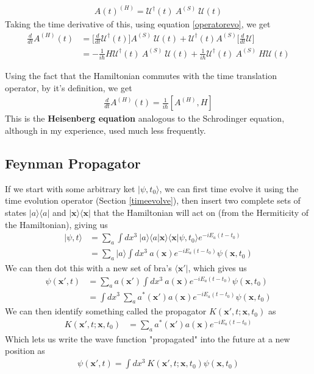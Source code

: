 \begin{align}
    A(t)^{(H)} = \mathcal{U}^\dagger(t)~ A^{(S)}~\mathcal{U}(t)
\end{align}
Taking the time derivative of this, using equation \ref{operatorevo}, we get
\begin{align}
    \frac{d}{dt} A^{(H)}(t) &= \Big[\frac{d}{dt}\mathcal{U}^\dagger(t)\Big]A^{(S)}~\mathcal{U}(t) + \mathcal{U}^\dagger(t)A^{(S)}\Big[\frac{d}{dt}\mathcal{U}\Big]\\
    &= - \frac{1}{i\hbar}H\mathcal{U}^\dagger(t)~ A^{(S)}~\mathcal{U}(t) + \frac{1}{i\hbar}\mathcal{U}^\dagger(t)~ A^{(S)}~H\mathcal{U}(t)
\end{align}

Using the fact that the Hamiltonian commutes with the time translation operator, by it's definition, we get 
\begin{align}
\frac{d}{dt} A^{(H)}(t) = \frac{1}{i\hbar}[A^{(H)},H]
\end{align}
This is the \textbf{Heisenberg equation} analogous to the Schrodinger equation, although in my experience, used much less frequently.

\subsection{Feynman Propagator}
If we start with some arbitrary ket $|\psi, t_0\rangle$, we can first time evolve it using the time evolution operator (Section \ref{timeevolve}), then insert two complete sets of states $|a\rangle\langle a|$  and $|\textbf{x}\rangle\langle\textbf{x}|$ that the Hamiltonian will act on (from the Hermiticity of the Hamiltonian), giving us
\begin{align}
|\psi, t\rangle &= \sum_a \int dx^3~|a\rangle\langle a|\textbf{x}\rangle \langle\textbf{x}|\psi,t_0\rangle e^{-iE_a(t-t_0)}\\
&=\sum_a |a\rangle \int dx^3~a(\textbf{x})e^{-iE_a(t-t_0)}\psi(\textbf{x},t_0) 
\end{align}
We can then dot this with a new set of bra's $\langle \textbf{x}'|$, which gives us
\begin{align}
\psi(\textbf{x}', t) &= \sum_a a(\textbf{x}') \int dx^3~a(\textbf{x})e^{-iE_a(t-t_0)}\psi(\textbf{x},t_0)\\
&= \int dx^3~\sum_a a^*(\textbf{x}') a(\textbf{x})e^{-iE_a(t-t_0)}\psi(\textbf{x},t_0)
\end{align}
We can then identify something called the propagator $K(\textbf{x}', t;\textbf{x},t_0)$ as
\begin{align}
K(\textbf{x}', t;\textbf{x},t_0) &= \sum_a a^*(\textbf{x}') a(\textbf{x})e^{-iE_a(t-t_0)}
\end{align}
Which lets us write the wave function "propagated" into the future at a new position as
\begin{align}
\psi(\textbf{x}', t) = \int dx^3~K(\textbf{x}', t;\textbf{x},t_0)\psi(\textbf{x},t_0)
\end{align}


